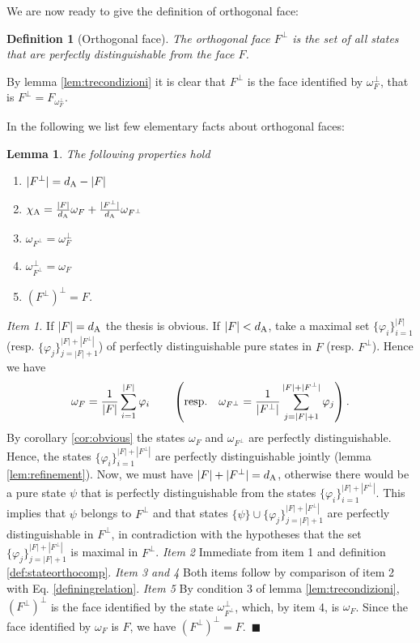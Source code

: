 \documentclass[12pt,aps,pra,showpacs,groupedaddress]{revtex4-1}
\newtheorem{lemma}{Lemma} \newtheorem{proposition}{Proposition}
\newtheorem{definition}{Definition}
\def\Proof{\medskip\par\noindent{\bf Proof. }}
\def\qed{$\,\blacksquare$\par}
\begin{document}
We are now ready to give the definition of orthogonal face:  
\begin{definition}[Orthogonal face]
The \emph{orthogonal face}  $F^\perp$  is the set  of all  states that are perfectly distinguishable from the face $F$.
\end{definition}
By lemma \ref{lem:trecondizioni} it is clear that $F^\perp$ is the face identified by
$\omega_F^\perp$, that is $F^\perp = F_{\omega_F^\perp}$.



In the following we list few elementary facts about orthogonal faces:  
\begin{lemma}\label{lem:list}  
The following properties hold
\begin{enumerate}
\item $|F^\perp|  = d_{\rm A} - |F|$
\item  $\chi_{\rm A}=\frac{|F|}{d_{\rm A}}\omega_F+\frac{|F^\perp|}{d_{\rm A}}\omega_{F^\perp}$
\item $\omega_{F^\perp}  = \omega_F^\perp$
\item $\omega_{F^\perp}^\perp  = \omega_F$
\item  $\left(F^\perp\right)^\perp = F$.
\end{enumerate}
\end{lemma}
\Proof \emph{Item 1.}  If $|F| = d_{\rm A} $ the thesis is obvious.  If $|F|< d_{\rm A}$, take a maximal set
$\{ \varphi_i\}_{i=1}^{|F|}$ (resp.  $\{ \varphi_j\}_{j=|F|+1}^{|F| + |F^\perp|}$) of perfectly
distinguishable pure states in $F$ (resp. $F^{\perp}$).  Hence we have
\begin{equation*}
  \omega_F = \frac 1 {|F|}  \sum_{i=1}^{|F|} \varphi_i    \qquad \left ( {\rm resp.} \quad \omega_{F^\perp}  = \frac 1 {|F^\perp|}  \sum_{j=|F|+1}^{|F| +  |F^\perp|}   \varphi_j \right).
\end{equation*}
By corollary \ref{cor:obvious}  the states $\omega_F$ and $\omega_{F^\perp}$ are perfectly distinguishable.  Hence, the states
$\{\varphi_i\}_{i=1}^{|F| + |F^\perp|}$ are perfectly distinguishable jointly (lemma
\ref{lem:refinement}).  Now, we must have $|F| + |F^\perp| = d_{\rm A}$, otherwise there would be a pure
state $\psi$ that is perfectly distinguishable from the states $\{\varphi_i\}_{i=1}^{|F| +
  |F^\perp|}$.  This implies that $\psi$ belongs to $F^\perp$ and that states $\{\psi\} \cup \{
\varphi_j\}_{j=|F|+1}^{|F| + |F^\perp|}$ are perfectly distinguishable in $F^\perp$, in
contradiction with the hypotheses that the set $\{ \varphi_j\}_{j=|F|+1}^{|F| + |F^\perp|}$ is maximal in
$F^\perp$.  \emph{Item 2} Immediate from item 1 and definition \ref{def:stateorthocomp}. \emph{Item 3 and 4} Both items follow by comparison
of item 2 with Eq.  \ref{definingrelation}.  \emph{Item 5} By condition 3 of lemma
\ref{lem:trecondizioni}, $\left(F^\perp\right)^\perp$ is the face identified by the state
$\omega_{F^\perp}^\perp$, which, by item 4, is $\omega_F$.  Since the face identified by $\omega_F$
is $F$, we have $\left(F^\perp\right)^\perp = F$.  \qed
\end{document}
